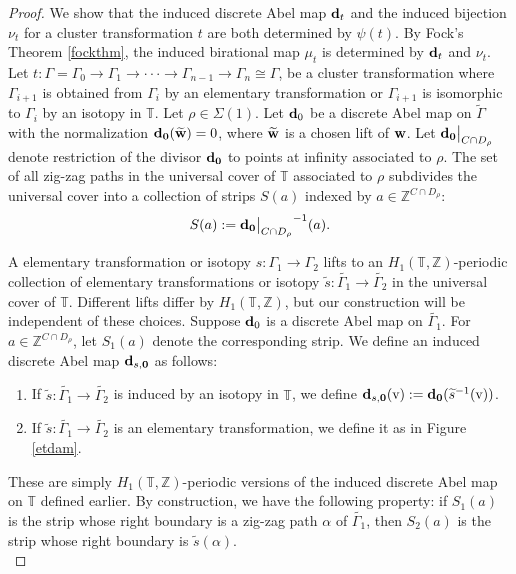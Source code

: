 \documentclass[11pt]{article} %
\theoremstyle{definition}
\newcommand{\Z}{{\mathbb Z}}
\newcommand{\T}{{\mathbb T}}
\newcommand\restr[2]{{%
  \left.\kern-\nulldelimiterspace %
  #1 %
  \vphantom{\big|} %
  \right|_{#2} %
  }}
\newcommand{\ra}{\rightarrow}
\begin{document}
\begin{proof}
We show that the induced discrete Abel map ${\bf d}_t$ and the induced bijection $\nu_t$ for a cluster transformation $t$ are both determined by $\psi(t)$. By Fock's Theorem \ref{fockthm}, the induced birational map $\mu_t$ is determined by ${\bf d}_t$ and $\nu_t$.\\


Let $t:\Gamma=\Gamma_0 \ra \Gamma_1 \ra \cdot \cdot \cdot \ra \Gamma_{n-1} \ra \Gamma_n \cong \Gamma$, be a cluster transformation  where $\Gamma_{i+1}$ is obtained from $\Gamma_i$ by an elementary transformation or $\Gamma_{i+1}$ is isomorphic to $\Gamma_i$ by an isotopy in $\T$. Let $\rho  \in \Sigma(1)$. Let ${\bf d}_0$ be a discrete Abel map on $\widetilde \Gamma$ with the normalization ${\bf d_0}({\bf \widetilde w})=0$, where ${\bf \widetilde w}$ is a chosen lift of ${\bf w}$. Let $\restr{\bf d_0}{C \cap D_\rho}$ denote restriction of the divisor ${\bf d_0}$ to points at infinity associated to $\rho$. The set of all zig-zag paths in the universal cover of $\T$ associated to $\rho$ subdivides the universal cover into a collection of strips $S(a)$ indexed by $a \in \Z^{C \cap D_\rho}$:
$$
S(a):=\restr{\bf d_0}{C \cap D_\rho}^{-1}(a). 
$$

 A elementary transformation or isotopy $s:\Gamma_1 \ra \Gamma_2$ lifts to an $H_1(\T,\Z)$-periodic collection of elementary transformations or isotopy $\widetilde s: \widetilde{\Gamma_1} \ra \widetilde {\Gamma_2}$ in the universal cover of $\T$. Different lifts differ by $H_1(\T,\Z)$, but our construction will be independent of these choices. Suppose ${\bf d}_0$ is a discrete Abel map on $\widetilde{\Gamma_1}$. For $a \in \Z^{C \cap D_\rho}$, let $S_1(a)$ denote the corresponding strip. We define an induced discrete Abel map ${\bf d}_{s,{\bf 0}}$ as follows:
\begin{enumerate}
    \item If $\widetilde s:\widetilde{\Gamma_1} \ra \widetilde{\Gamma_2}$ is induced by an isotopy in $\T$, we define ${\bf d}_{s,{\bf 0}}(\text v):={\bf d}_{\bf 0}(\widetilde s^{-1}(\text v))$.
    \item If $\widetilde s:\widetilde{\Gamma_1} \ra \widetilde{\Gamma_2}$ is an elementary transformation, we define it as in Figure \ref{etdam}.
\end{enumerate}
These are simply $H_1(\T,\Z)$-periodic versions of the induced discrete Abel map on $\T$ defined earlier. By construction, we have the following property: if $S_1(a)$ is the strip whose right boundary is a zig-zag path $\alpha$ of $\widetilde{\Gamma_1}$, then $S_2(a)$ is the strip whose right boundary is $\widetilde s(\alpha)$.\\


\end{proof}
\end{document}

